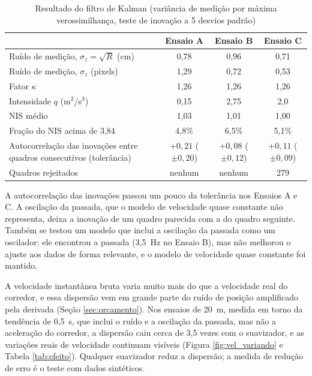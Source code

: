 \documentclass[
    12pt,               %
    openright,          %
    twoside,            %
    a4paper,            %
    chapter=TITLE,      %
    english,            %
    brazil              %
    ]{abntex2}
\begin{document}
\begin{table}[H]
\centering
\small
\caption{Resultado do filtro de Kalman (variância de medição por máxima verossimilhança, teste de inovação a 5 desvios padrão)}
\label{tab:kalman}
\begin{tabular}{L{0.36\textwidth}ccc}
\hline
 & \textbf{Ensaio A} & \textbf{Ensaio B} & \textbf{Ensaio C} \\
\hline
Ruído de medição, $\sigma_z = \sqrt{R}$ (cm) & 0,78 & 0,96 & 0,71 \\
Ruído de medição, $\sigma_z$ (pixels) & 1,29 & 0,72 & 0,53 \\
Fator $\kappa$ & 1,26 & 1,26 & 1,26 \\
Intensidade $q$ (m$^2$/s$^3$) & 0,15 & 2,75 & 2,0 \\
NIS médio & 1,03 & 1,01 & 1,00 \\
Fração do NIS acima de 3,84 & 4,8\% & 6,5\% & 5,1\% \\
Autocorrelação das inovações entre quadros consecutivos (tolerância) & $+0{,}21$ ($\pm 0{,}20$) & $+0{,}08$ ($\pm 0{,}12$) & $+0{,}11$ ($\pm 0{,}09$) \\
Quadros rejeitados & nenhum & nenhum & 279 \\
\hline
\end{tabular}
\end{table}

A autocorrelação das inovações passou um pouco da tolerância nos Ensaios A e C. A oscilação da passada, que o modelo de velocidade quase constante não representa, deixa a inovação de um quadro parecida com a do quadro seguinte. Também se testou um modelo que inclui a oscilação da passada como um oscilador; ele encontrou a passada (3,5~Hz no Ensaio B), mas não melhorou o ajuste aos dados de forma relevante, e o modelo de velocidade quase constante foi mantido.

A velocidade instantânea bruta varia muito mais do que a velocidade real do corredor, e essa dispersão vem em grande parte do ruído de posição amplificado pela derivada (Seção \ref{sec:orcamento}). Nos ensaios de 20~m, medida em torno da tendência de 0,5~s, que inclui o ruído e a oscilação da passada, mas não a aceleração do corredor, a dispersão caiu cerca de 3,5 vezes com o suavizador, e as variações reais de velocidade continuam visíveis (Figura \ref{fig:vel_variando} e Tabela \ref{tab:efeito}). Qualquer suavizador reduz a dispersão; a medida de redução de erro é o teste com dados sintéticos.
\end{document}
